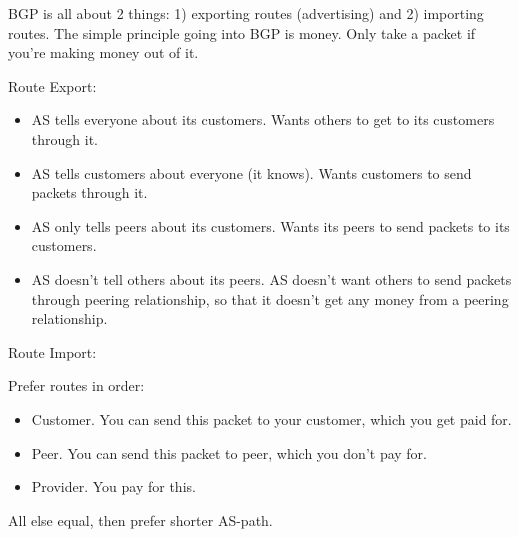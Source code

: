 \documentclass[psamsfonts]{amsart}
\begin{document}
BGP is all about 2 things: 1) exporting routes (advertising) and 2) importing routes. The simple principle going into BGP is money. Only take a packet if you're making money out of it.

Route Export:

\begin{itemize}
  \item AS tells everyone about its customers. Wants others to get to its customers through it.
  \item AS tells customers about everyone (it knows). Wants customers to send packets through it.
  \item AS only tells peers about its customers. Wants its peers to send packets to its customers.
  \item AS doesn't tell others about its peers. AS doesn't want others to send packets through peering relationship, so that it doesn't get any money from a peering relationship.
\end{itemize}

Route Import:

Prefer routes in order:
\begin{itemize}
  \item Customer. You can send this packet to your customer, which you get paid for.
  \item Peer. You can send this packet to peer, which you don't pay for.
  \item Provider. You pay for this.
\end{itemize}

All else equal, then prefer shorter AS-path.
\end{document}
